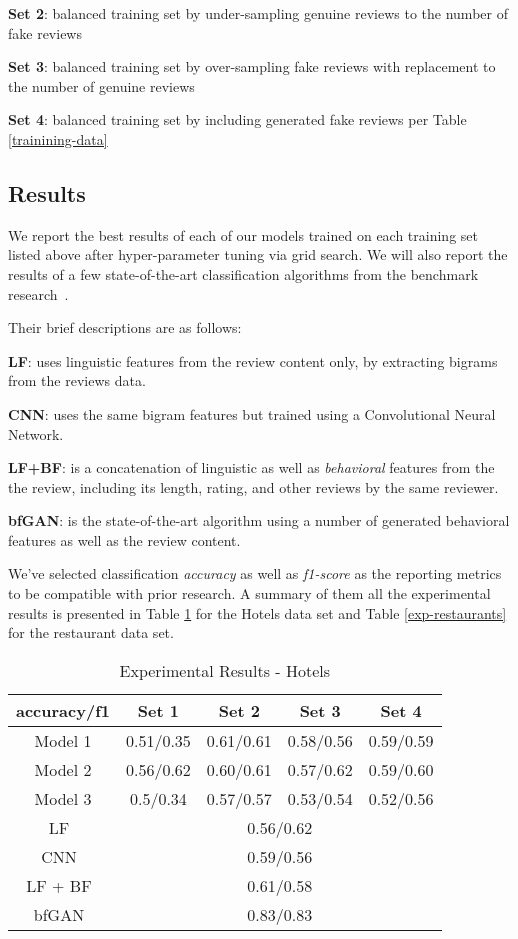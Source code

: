 \documentclass[conference, 11pt]{IEEEtran} %
\theoremstyle{plain}
\theoremstyle{definition}
\begin{document}
 \textbf{Set 2}: balanced training set by under-sampling genuine reviews to the number of fake reviews
 
 \textbf{Set 3}: balanced training set by over-sampling fake reviews with replacement to the number of genuine reviews
 
 \textbf{Set 4}: balanced training set by including generated fake reviews per Table \ref{trainining-data}

\subsection{Results}
We report the best results of each of our models trained on each training set listed above after hyper-parameter tuning via grid search. We will also report the results of a few state-of-the-art classification algorithms from the benchmark research~\cite{Tang2020}.

Their brief descriptions are as follows:

\textbf{LF}: uses linguistic features from the review content only, by extracting bigrams from the reviews data.

\textbf{CNN}: uses the same bigram features but trained using a Convolutional Neural Network.

\textbf{LF+BF}: is a concatenation of linguistic as well as \textit{behavioral} features from the the review, including its length, rating, and other reviews by the same reviewer.

\textbf{bfGAN}: is the state-of-the-art algorithm using a number of generated behavioral features as well as the review content.

We've selected classification \textit{accuracy} as well as \textit{f1-score} as the reporting metrics to be compatible with prior research. A summary of them all the experimental results is presented in Table \ref{exp-hotels} for the Hotels data set and Table \ref{exp-restaurants} for the restaurant data set.

\begin{table}[H]
\small
\caption{Experimental Results - Hotels}
\centering
\begin{tabular}{|c|c|c|c|c|}
\hline
 accuracy/f1 & Set 1 & Set 2 & Set 3 & Set 4 \\ \hline
 
Model 1 & 0.51/0.35 & 0.61/0.61 & 0.58/0.56 & 0.59/0.59 \\ \hline
Model 2 & 0.56/0.62 & 0.60/0.61 & 0.57/0.62 & 0.59/0.60 \\ \hline
Model 3 & 0.5/0.34 & 0.57/0.57 & 0.53/0.54 & 0.52/0.56 \\ \hline
LF~\cite{Tang2020} & \multicolumn{4}{c|}{0.56/0.62} \\ \hline
CNN~\cite{Tang2020} & \multicolumn{4}{c|}{0.59/0.56} \\ \hline
LF + BF~\cite{Tang2020} & \multicolumn{4}{c|}{0.61/0.58} \\ \hline
bfGAN~\cite{Tang2020} & \multicolumn{4}{c|}{0.83/0.83} \\
\hline
\end{tabular}
\label{exp-hotels}
\end{table}
\end{document}
